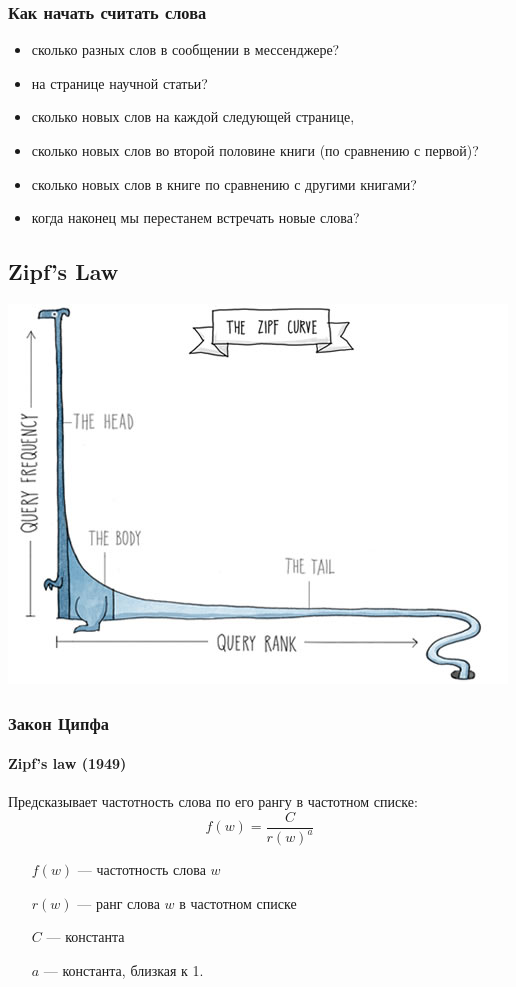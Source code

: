 \documentclass[svgnames]{beamer}
\begin{document}
\begin{frame}
  \frametitle{Как начать считать слова}
  \begin{itemize}[<+->]
  \item сколько разных слов в сообщении в
    мессенджере?
  \item на странице научной статьи?
  \item сколько новых слов на каждой следующей
  странице,
  \item сколько новых слов во второй половине книги (по
    сравнению с первой)?
  \item сколько новых слов в книге по сравнению
  с другими книгами? 
  \item когда наконец мы перестанем встречать новые слова?
  \end{itemize}
\end{frame}

\subsection{Zipf's Law}

\begin{frame}[plain]
  \includegraphics[width=\textwidth]{zipf-animal}
\end{frame}

\begin{frame}
  \frametitle{Закон Ципфа}
  \framesubtitle{Zipf's law (1949)}
  Предсказывает частотность слова по его рангу в частотном списке:
    \begin{equation}
      f(w) = \frac{C}{r(w)^a}
    \end{equation}
    \begin{itemize}
    \item[$f(w)$] — частотность слова $w$
    \item[$r(w)$] — ранг слова $w$ в частотном списке
    \item[$C$] — константа
    \item[$a$] — константа, близкая к 1.
    \end{itemize}
\end{frame}
\end{document}
